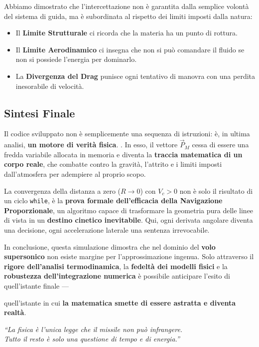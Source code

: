 \documentclass[12pt,a4paper]{article}
\begin{document}
Abbiamo dimostrato che l'intercettazione non è garantita dalla semplice volontà del sistema di guida, ma è subordinata al rispetto dei limiti imposti dalla natura:
\begin{itemize}
    \item Il \textbf{Limite Strutturale} ci ricorda che la materia ha un punto di rottura.
    \item Il \textbf{Limite Aerodinamico} ci insegna che non si può comandare il fluido se non si possiede l'energia per dominarlo.
    \item La \textbf{Divergenza del Drag} punisce ogni tentativo di manovra con una perdita inesorabile di velocità.
\end{itemize}

\subsection{Sintesi Finale}
Il codice sviluppato non è semplicemente una sequenza di istruzioni: è, in ultima analisi, \textbf{un motore di verità fisica}.  . In esso, il vettore $\vec{P}_M$ cessa di essere una fredda variabile allocata in memoria e diventa la \textbf{traccia matematica di un corpo reale}, che combatte contro la gravità, l’attrito e i limiti imposti dall’atmosfera per adempiere al proprio scopo. 

La convergenza della distanza a zero ($R \to 0$) con $V_c > 0$ non è solo il risultato di un ciclo \texttt{while}, è la \textbf{prova formale dell’efficacia della Navigazione Proporzionale}, un algoritmo capace di trasformare la geometria pura delle linee di vista in un \textbf{destino cinetico inevitabile}. Qui, ogni derivata angolare diventa una decisione, ogni accelerazione laterale una sentenza irrevocabile.

In conclusione, questa simulazione dimostra che nel dominio del \textbf{volo supersonico} non esiste margine per l’approssimazione ingenua. Solo attraverso il \textbf{rigore dell’analisi termodinamica}, la \textbf{fedeltà dei modelli fisici} e la \textbf{robustezza dell’integrazione numerica} è possibile anticipare l’esito di quell’istante finale —

 quell’istante in cui \textbf{la matematica smette di essere astratta e diventa realtà}.

 

\vspace{2cm}

\begin{center}
    \textit{``La fisica è l'unica legge che il missile non può infrangere.\\ Tutto il resto è solo una questione di tempo e di energia.''}
\end{center}
\end{document}

